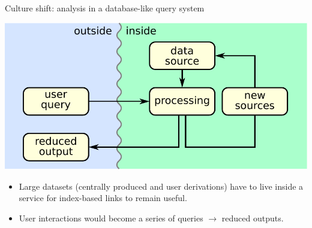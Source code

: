\documentclass[aspectratio=169]{beamer}
\begin{document}
\begin{frame}{Culture shift: analysis in a database-like query system}
\vspace{0.5 cm}

\begin{center}
\includegraphics[width=0.65\linewidth]{basic-block-diagram.pdf}
\end{center}

\begin{itemize}
\item Large datasets (centrally produced and user derivations) have to live inside a service for index-based links to remain useful.
\item User interactions would become a series of queries $\to$ reduced outputs.
\end{itemize}
\end{frame}
\end{document}
